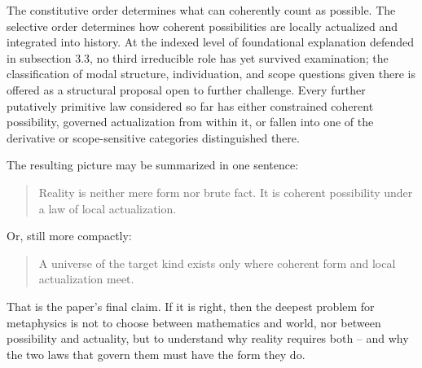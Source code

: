 \documentclass[11pt]{article}
\theoremstyle{foundation}
\begin{document}
The constitutive order determines what can coherently count as possible. The selective order determines how coherent possibilities are locally actualized and integrated into history. At the indexed level of foundational explanation defended in subsection 3.3, no third irreducible role has yet survived examination; the classification of modal structure, individuation, and scope questions given there is offered as a structural proposal open to further challenge. Every further putatively primitive law considered so far has either constrained coherent possibility, governed actualization from within it, or fallen into one of the derivative or scope-sensitive categories distinguished there.

The resulting picture may be summarized in one sentence:

\begin{quote}
Reality is neither mere form nor brute fact. It is coherent possibility under a law of local actualization.
\end{quote}

Or, still more compactly:

\begin{quote}
A universe of the target kind exists only where coherent form and local actualization meet.
\end{quote}

That is the paper's final claim. If it is right, then the deepest problem for metaphysics is not to choose between mathematics and world, nor between possibility and actuality, but to understand why reality requires both -- and why the two laws that govern them must have the form they do.



\end{document}
